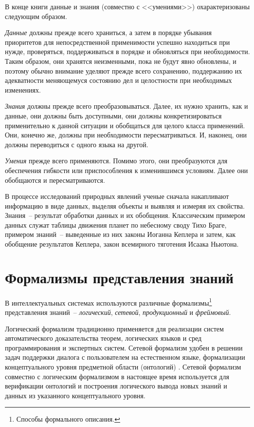 \documentclass[a4paper,14pt, openany, twoside, draft]{extbook} %
\begin{document}
В конце книги \cite{DDWII} данные и знания (совместно с <<умениями>>) охарактеризованы следующим образом.

{\em Данные} должны прежде всего храниться, а затем в порядке убывания приоритетов для непосредственной применимости успешно находиться при нужде, проверяться, поддерживаться в порядке и обновляться при необходимости. Таким образом, они хранятся неизменными, пока не будут явно обновлены, и поэтому обычно внимание уделяют прежде всего сохранению, поддержанию их адекватности меняющемуся состоянию дел и целостности при необходимых изменениях.

{\em Знания} должны прежде всего преобразовываться. Далее, их нужно хранить, как и данные, они должны быть доступными, они должны конкретизироваться применительно к данной ситуации и обобщаться для целого класса применений. Они, конечно же, должны при необходимости пересматриваться. И, наконец, они должны переводиться с одного языка на другой.

{\em Умения} прежде всего применяются. Помимо этого, они преобразуются для обеспечения гибкости или приспособления к изменившимся условиям. Далее они обобщаются и пересматриваются.

В процессе исследований природных явлений ученые сначала накапливают информацию в виде данных, выделяя объекты и выявляя и измеряя их свойства.  Знания~-- результат обработки данных и их обобщения.  Классическим примером данных служат таблицы движения планет по небесному своду Тихо Браге, примером знаний~-- выведенные из них законы Иоганна Кеплера и затем, как обобщение результатов Кеплера, закон всемирного тяготения Исаака Ньютона.

\section{Формализмы представления знаний}
\label{sec:knowlege_repr}

В интеллектуальных системах используются различные формализмы\footnote{Способы формального описания.} представления знаний~-- {\em логический}, {\em сетевой}, {\em продукционный} и {\em фреймовый}.

Логический формализм традиционно применяется для реализации систем автоматического доказательства теорем, логических языков и сред программирования и экспертных систем.  Сетевой формализм удобен в решении задач поддержки диалога с пользователем на естественном языке, формализации концептуального уровня предметной области (онтологий) \cite{ontodef}.  Сетевой формализм совместно с логическим формализмом в настоящее время используется для верификации онтологий и построения логического вывода новых знаний и данных из указанного концептуального уровня.
\end{document}
